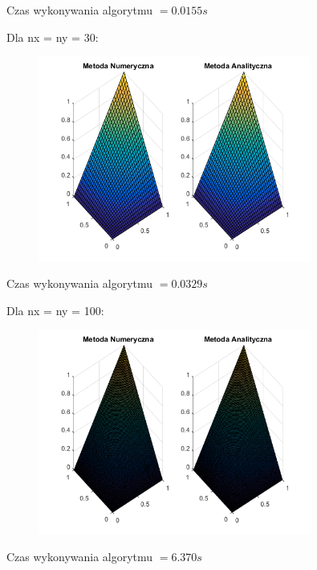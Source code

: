 Czas wykonywania algorytmu $ = 0.0155 s$

\newpage
Dla nx = ny = 30:

\begin{figure}[!ht]
	\begin{center}
		\includegraphics[width=0.8\textwidth]{Lab5/charts/zad1/30x30.png}
	\end{center}
\end{figure}

Czas wykonywania algorytmu $ = 0.0329 s$

Dla nx = ny = 100:

\begin{figure}[!ht]
	\begin{center}
		\includegraphics[width=0.8\textwidth]{Lab5/charts/zad1/100x100.png}
	\end{center}
\end{figure}

Czas wykonywania algorytmu $ = 6.370 s$

\newpage

